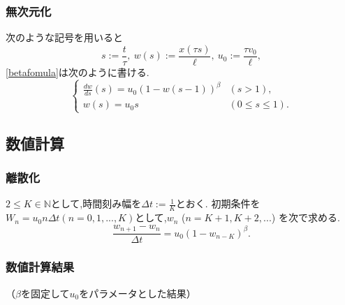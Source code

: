 \documentclass [dvipdfmx] {jsarticle}
\numberwithin{equation}{section}
\theoremstyle{definition} %
\theoremstyle{definition} %
\begin{document}
\subsubsection{無次元化}
次のような記号を用いると
\begin{equation}
    s:=\frac{t}{\tau},\ w(s):=\frac{x(\tau s)}{\ell},\ u_0:=\frac{\tau v_0}{\ell},
\end{equation}
\eqref{betafomula}は次のように書ける.
\begin{equation}\label{betafomula2}\begin{cases}
    \displaystyle\frac{dw}{ds}(s)=u_0(1-w(s-1))^\beta &(s>1),\\
    w(s)=u_0 s &(0\le s \le 1).
\end{cases}\end{equation}


\subsection{数値計算}


\subsubsection{離散化}
$2\le K\in\mathbb{N}$として,時間刻み幅を$\Delta t:=\frac{1}{K}$とおく.
初期条件を$W_n=u_0n\Delta t (n=0,1,...,K)$として,$w_n $ ($n=K+1,K+2,...$)
を次で求める.
\begin{equation}
    \displaystyle\frac{w_{n+1}-w_n}{\Delta t}=u_0(1-w_{n-K})^\beta.
\end{equation}


\subsubsection{数値計算結果}
（$\beta$を固定して$u_0$をパラメータとした結果）
\end{document}

